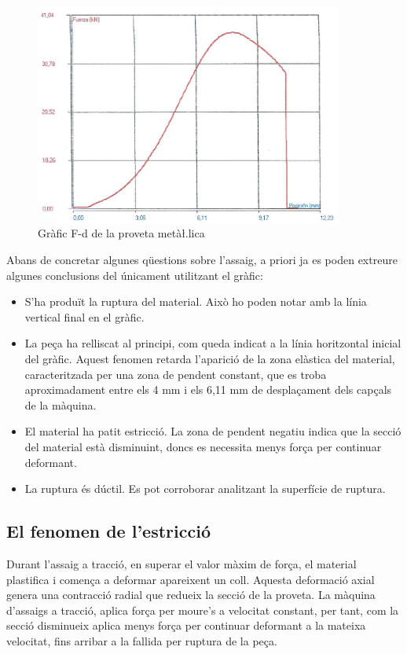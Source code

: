 \documentclass[a4paper]{report}
\begin{document}
\begin{figure}[hb]
    \centering
    \includegraphics[width=0.9\textwidth]{images/traccio/metalica-grafic-proveta}
    \caption{Gràfic F-d de la proveta metà\l.lica}
    \label{fig:traccio-metalica-grafic-proveta}
\end{figure}

Abans de concretar algunes qüestions sobre l'assaig, a priori ja es poden extreure algunes conclusions del únicament utilitzant el gràfic:
\begin{itemize}
    \item  S'ha produït la ruptura del material. Això ho poden notar amb la línia vertical final en el gràfic.
    \item  La peça ha relliscat al principi, com queda indicat a la línia horitzontal inicial del gràfic. Aquest fenomen retarda l'aparició de la zona elàstica del material, caracteritzada per una zona de pendent constant, que es troba aproximadament entre els 4 mm i els 6,11 mm de desplaçament dels capçals de la màquina.
    \item  El material ha patit estricció. La zona de pendent negatiu indica que la secció del material està disminuint, doncs es necessita menys força per continuar deformant.
    \item  La ruptura és dúctil. Es pot corroborar analitzant la superfície de ruptura.
\end{itemize}

\subsection{El fenomen de l'estricció}

Durant l'assaig a tracció, en superar el valor màxim de força, el material plastifica i comença a deformar apareixent un coll. Aquesta deformació axial genera una contracció radial que redueix la secció de la proveta. La màquina d'assaigs a tracció, aplica força per moure's a velocitat constant, per tant, com la secció disminueix aplica menys força per continuar deformant a la mateixa velocitat, fins arribar a la fallida per ruptura de la peça.
\end{document}
